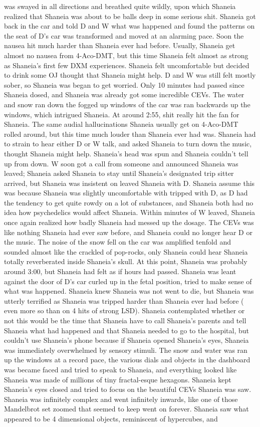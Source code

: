 \documentclass[12pt]{book}
\begin{document}
was swayed in all directions and breathed quite wildly, upon which Shaneia realized that Shaneia was about to be balls deep in some serious shit. Shaneia got back in the car and told D and W what was happened and found the patterns on the seat of D's car was transformed and moved at an alarming pace. Soon the nausea hit much harder than Shaneia ever had before. Usually, Shaneia get almost no nausea from 4-Aco-DMT, but this time Shaneia felt almost as strong as Shaneia's first few DXM experiences. Shaneia felt uncomfortable but decided to drink some OJ thought that Shaneia might help. D and W was still felt mostly sober, so Shaneia was began to get worried. Only 10 minutes had passed since Shaneia dosed, and Shaneia was already got some incredible CEVs. The water and snow ran down the fogged up windows of the car was ran backwards up the windows, which intrigued Shaneia. At around 2:55, shit really hit the fan for Shaneia. The same audial hallucinations Shaneia usually get on 4-Aco-DMT rolled around, but this time much louder than Shaneia ever had was. Shaneia had to strain to hear either D or W talk, and asked Shaneia to turn down the music, thought Shaneia might help. Shaneia's head was spun and Shaneia couldn't tell up from down. W soon got a call from someone and announced Shaneia was leaved; Shaneia asked Shaneia to stay until Shaneia's designated trip sitter arrived, but Shaneia was insistent on leaved Shaneia with D. Shaneia assume this was because Shaneia was slightly uncomfortable with tripped with D, as D had the tendency to get quite rowdy on a lot of substances, and Shaneia both had no idea how psychedelics would affect Shaneia. Within minutes of W leaved, Shaneia once again realized how badly Shaneia had messed up the dosage. The CEVs was like nothing Shaneia had ever saw before, and Shaneia could no longer hear D or the music. The noise of the snow fell on the car was amplified tenfold and sounded almost like the crackled of pop-rocks, only Shaneia could hear Shaneia totally reverberated inside Shaneia's skull. At this point, Shaneia was probably around 3:00, but Shaneia had felt as if hours had passed. Shaneia was leant against the door of D's car curled up in the fetal position, tried to make sense of what was happened. Shaneia knew Shaneia was not went to die, but Shaneia was utterly terrified as Shaneia was tripped harder than Shaneia ever had before ( even more so than on 4 hits of strong LSD). Shaneia contemplated whether or not this would be the time that Shaneia have to call Shaneia's parents and tell Shaneia what had happened and that Shaneia needed to go to the hospital, but couldn't use Shaneia's phone because if Shaneia opened Shaneia's eyes, Shaneia was immediately overwhelmed by sensory stimuli. The snow and water was ran up the windows at a record pace, the various dials and objects in the dashboard was became faced and tried to speak to Shaneia, and everything looked like Shaneia was made of millions of tiny fractal-esque hexagons. Shaneia kept Shaneia's eyes closed and tried to focus on the beautiful CEVs Shaneia was saw. Shaneia was infinitely complex and went infinitely inwards, like one of those Mandelbrot set zoomed that seemed to keep went on forever. Shaneia saw what appeared to be 4 dimensional objects, reminiscent of hypercubes, and 
\end{document}

